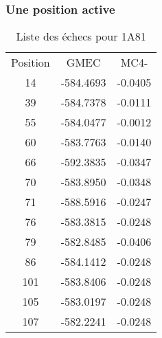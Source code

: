    \subsubsection{Une position active}


    \begin{table}[h]
      \centering

      \begin{tabular}{ccc}


        \toprule
        Position & GMEC & MC4- \\
        \cmidrule{1-3}
        14 & -584.4693 & -0.0405 \\
        39 & -584.7378 & -0.0111 \\
        55 & -584.0477 & -0.0012 \\
        60 & -583.7763 & -0.0140 \\
        66 & -592.3835 & -0.0347 \\
        70 & -583.8950 & -0.0348 \\
        71 & -588.5916 & -0.0247 \\
        76 & -583.3815 & -0.0248 \\
        79 & -582.8485 & -0.0406 \\
        86 & -584.1412 & -0.0248 \\
        101 & -583.8406 & -0.0248 \\
        105 & -583.0197 & -0.0248 \\
        107 & -582.2241 & -0.0248 \\

        \bottomrule

      \end{tabular}      
      \caption{Liste des échecs pour 1A81}
\label{tab:result_1_active_1A81}      
    \end{table}


